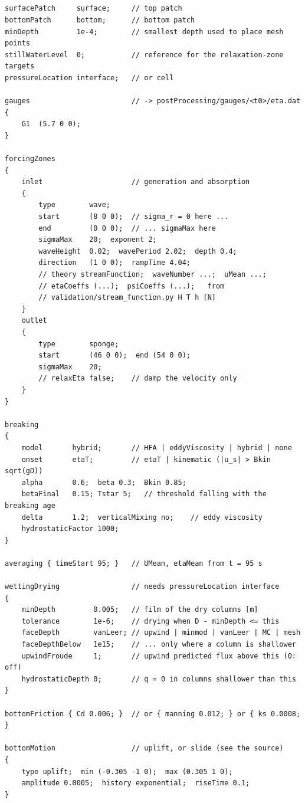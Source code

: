 \subsection{}

\begin{verbatim}
surfacePatch     surface;     // top patch
bottomPatch      bottom;      // bottom patch
minDepth         1e-4;        // smallest depth used to place mesh points
stillWaterLevel  0;           // reference for the relaxation-zone targets
pressureLocation interface;   // or cell

gauges                        // -> postProcessing/gauges/<t0>/eta.dat
{
    G1  (5.7 0 0);
}

forcingZones
{
    inlet                     // generation and absorption
    {
        type        wave;
        start       (8 0 0);  // sigma_r = 0 here ...
        end         (0 0 0);  // ... sigmaMax here
        sigmaMax    20;  exponent 2;
        waveHeight  0.02;  wavePeriod 2.02;  depth 0.4;
        direction   (1 0 0);  rampTime 4.04;
        // theory streamFunction;  waveNumber ...;  uMean ...;
        // etaCoeffs (...);  psiCoeffs (...);   from
        // validation/stream_function.py H T h [N]
    }
    outlet
    {
        type        sponge;
        start       (46 0 0);  end (54 0 0);
        sigmaMax    20;
        // relaxEta false;    // damp the velocity only
    }
}

breaking
{
    model       hybrid;       // HFA | eddyViscosity | hybrid | none
    onset       etaT;         // etaT | kinematic (|u_s| > Bkin sqrt(gD))
    alpha       0.6;  beta 0.3;  Bkin 0.85;
    betaFinal   0.15; Tstar 5;   // threshold falling with the breaking age
    delta       1.2;  verticalMixing no;    // eddy viscosity
    hydrostaticFactor 1000;
}

averaging { timeStart 95; }   // UMean, etaMean from t = 95 s

wettingDrying                 // needs pressureLocation interface
{
    minDepth         0.005;   // film of the dry columns [m]
    tolerance        1e-6;    // drying when D - minDepth <= this
    faceDepth        vanLeer; // upwind | minmod | vanLeer | MC | mesh
    faceDepthBelow   1e15;    // ... only where a column is shallower
    upwindFroude     1;       // upwind predicted flux above this (0: off)
    hydrostaticDepth 0;       // q = 0 in columns shallower than this
}

bottomFriction { Cd 0.006; }  // or { manning 0.012; } or { ks 0.0008; }

bottomMotion                  // uplift, or slide (see the source)
{
    type uplift;  min (-0.305 -1 0);  max (0.305 1 0);
    amplitude 0.0005;  history exponential;  riseTime 0.1;
}
\end{verbatim}

